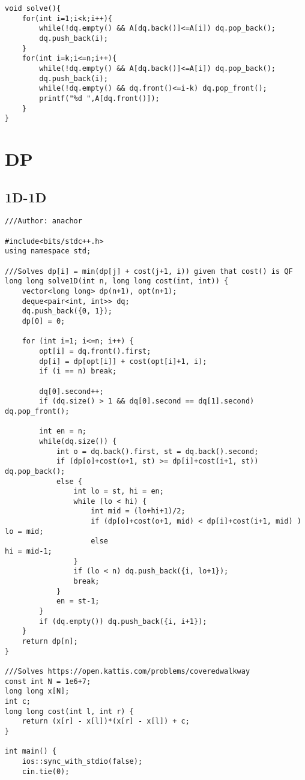 \documentclass[FSZ,a4paper,onesided]{article}
\begin{document}
\begin{multicols*}{\COLS}
\begin{lstlisting}
void solve(){
    for(int i=1;i<k;i++){
        while(!dq.empty() && A[dq.back()]<=A[i]) dq.pop_back();
        dq.push_back(i);
    }
    for(int i=k;i<=n;i++){
        while(!dq.empty() && A[dq.back()]<=A[i]) dq.pop_back();
        dq.push_back(i);
        while(!dq.empty() && dq.front()<=i-k) dq.pop_front();
        printf("%d ",A[dq.front()]);
    }
}
\end{lstlisting}
\section{DP}
\subsection{1D-1D}
\begin{lstlisting}
///Author: anachor

#include<bits/stdc++.h>
using namespace std;

///Solves dp[i] = min(dp[j] + cost(j+1, i)) given that cost() is QF
long long solve1D(int n, long long cost(int, int)) {
    vector<long long> dp(n+1), opt(n+1);
    deque<pair<int, int>> dq;
    dq.push_back({0, 1});
    dp[0] = 0;

    for (int i=1; i<=n; i++) {
        opt[i] = dq.front().first;
        dp[i] = dp[opt[i]] + cost(opt[i]+1, i);
        if (i == n) break;

        dq[0].second++;
        if (dq.size() > 1 && dq[0].second == dq[1].second)  dq.pop_front();

        int en = n;
        while(dq.size()) {
            int o = dq.back().first, st = dq.back().second;
            if (dp[o]+cost(o+1, st) >= dp[i]+cost(i+1, st))  dq.pop_back();
            else {
                int lo = st, hi = en;
                while (lo < hi) {
                    int mid = (lo+hi+1)/2;
                    if (dp[o]+cost(o+1, mid) < dp[i]+cost(i+1, mid) )   lo = mid;
                    else                                                hi = mid-1;
                }
                if (lo < n) dq.push_back({i, lo+1});
                break;
            }
            en = st-1;
        }
        if (dq.empty()) dq.push_back({i, i+1});
    }
    return dp[n];
}

///Solves https://open.kattis.com/problems/coveredwalkway
const int N = 1e6+7;
long long x[N];
int c;
long long cost(int l, int r) {
    return (x[r] - x[l])*(x[r] - x[l]) + c;
}

int main() {
    ios::sync_with_stdio(false);
    cin.tie(0);


\end{lstlisting}
\end{multicols*}
\end{document}
